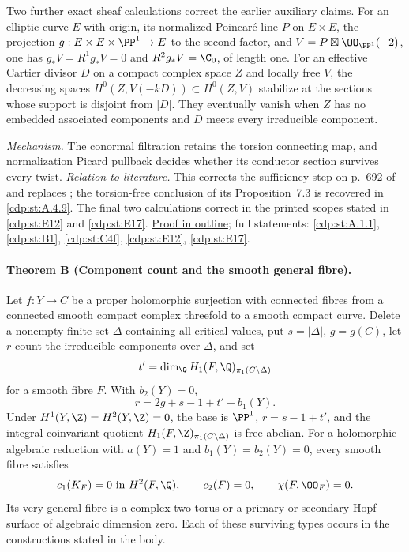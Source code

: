 Two further exact sheaf calculations correct the earlier auxiliary
claims. For an elliptic curve $E$ with origin, its normalized
Poincar\'e line $P$ on $E\times E$, the projection
$g:E\times E\times\PP^1\to E$ to the second factor, and
$V=P\boxtimes\OO_{\PP^1}(-2)$, one has
$g_*V=R^1g_*V=0$ and $R^2g_*V=\C_0$, of length one.
For an effective Cartier divisor $D$ on a compact complex space
$Z$ and locally free $V$, the decreasing spaces
$H^0(Z,V(-kD))\subset H^0(Z,V)$ stabilize at the sections whose
support is disjoint from $|D|$. They eventually vanish when $Z$
has no embedded associated components and $D$ meets every
irreducible component.

\textit{Mechanism.} The conormal filtration retains the torsion
connecting map, and normalization Picard pullback decides whether
its conductor section survives every twist.
\textit{Relation to literature.} This corrects the sufficiency step
on p.~692 of \cite{CDP2020} and replaces
\cite[Theorem~2.2]{CDP2020}; the torsion-free conclusion of its
Proposition~7.3 is recovered in \ref{cdp:st:A.4.9}.
The final two calculations correct \cite[Lemma~1.5 and
Proposition~1.1]{CDP98} in the printed scopes stated in
\ref{cdp:st:E12} and \ref{cdp:st:E17}.
\hyperlink{outline-II-A}{Proof in outline}; full statements:
\ref{cdp:st:A.1.1}, \ref{cdp:st:B1}, \ref{cdp:st:C4f},
\ref{cdp:st:E12}, \ref{cdp:st:E17}.

\hypertarget{main-II-B}{}
\paragraph{Theorem B (Component count and the smooth general fibre).}
\label{series:II:B}
Let $f:Y\to C$ be a proper holomorphic surjection with connected
fibres from a connected smooth compact complex threefold to a
smooth compact curve. Delete a nonempty finite set $\Delta$
containing all critical values, put $s=|\Delta|$, $g=g(C)$,
let $r$ count the irreducible components over $\Delta$, and set
\[
 t'=\dim_\Q H_1(F,\Q)_{\pi_1(C\setminus\Delta)}
\]
for a smooth fibre $F$. With $b_2(Y)=0$,
\[
 r=2g+s-1+t'-b_1(Y).
\]
Under $H^1(Y,\Z)=H^2(Y,\Z)=0$, the base is $\PP^1$,
$r=s-1+t'$, and the integral coinvariant quotient
$H_1(F,\Z)_{\pi_1(C\setminus\Delta)}$ is free abelian.
For a holomorphic algebraic reduction with $a(Y)=1$ and
$b_1(Y)=b_2(Y)=0$, every smooth fibre satisfies
\[
 c_1(K_F)=0\text{ in }H^2(F,\Q),\qquad
 c_2(F)=0,\qquad \chi(F,\OO_F)=0.
\]
Its very general fibre is a complex two-torus or a primary or
secondary Hopf surface of algebraic dimension zero. Each of these
surviving types occurs in the constructions stated in the body.

